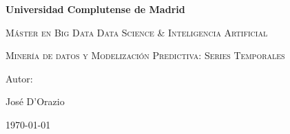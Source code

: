 \thispagestyle{empty}
\begin{titlepage}
	\centering
	{\bfseries\LARGE Universidad Complutense de Madrid\par}
	\vspace{1cm}
	{\scshape\Large Máster en Big Data Data Science \& Inteligencia Artificial \par}
	\vspace{3cm}
	{\scshape\Huge Minería de datos y Modelización Predictiva: Series Temporales \par}
	\vspace{3cm}
	
	\vfill
	{\Large Autor: \par}
	{\Large José D'Orazio \par}
	\vfill
	{\Large \today \par}
\end{titlepage}
